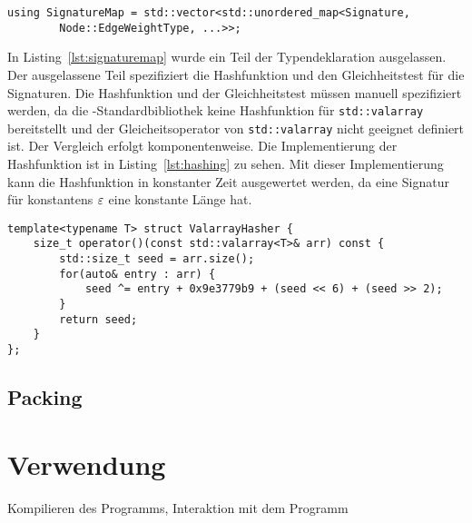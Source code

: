 \begin{lstlisting}[caption={Definition von \texttt{SignatureMap}}, label={lst:signaturemap}]
    using SignatureMap = std::vector<std::unordered_map<Signature, 
        Node::EdgeWeightType, ...>>;
\end{lstlisting}

In Listing~\ref{lst:signaturemap} wurde ein Teil der Typendeklaration ausgelassen.
Der ausgelassene Teil spezifiziert die Hashfunktion und den Gleichheitstest für die Signaturen.
Die Hashfunktion und der Gleichheitstest müssen manuell spezifiziert werden, da die \Cpp{}\hyp Standardbibliothek keine Hashfunktion für \texttt{std::valarray} bereitstellt und der Gleicheitsoperator von \texttt{std::valarray} nicht geeignet definiert ist.
Der Vergleich erfolgt komponentenweise.
Die Implementierung der Hashfunktion ist in Listing~\ref{lst:hashing} zu sehen.
Mit dieser Implementierung kann die Hashfunktion in konstanter Zeit ausgewertet werden, da eine Signatur für konstantens $\varepsilon$ eine konstante Länge hat.

\begin{lstlisting}[float, floatplacement=h, caption={Hashing mit \texttt{ValarrayHasher}}, label={lst:hashing}]
template<typename T> struct ValarrayHasher {
    size_t operator()(const std::valarray<T>& arr) const {
		std::size_t seed = arr.size();
		for(auto& entry : arr) {
			seed ^= entry + 0x9e3779b9 + (seed << 6) + (seed >> 2);
		}
		return seed;
	}
};
\end{lstlisting}

\subsection{Packing}

\section{Verwendung}
Kompilieren des Programms, Interaktion mit dem Programm
